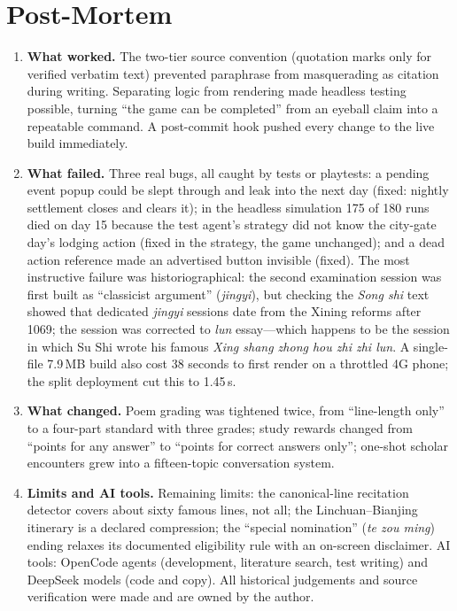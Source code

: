 \documentclass[12pt,a4paper]{article}
\begin{document}
\section{Post-Mortem}

\begin{enumerate}
  \item \textbf{What worked.} The two-tier source convention (quotation marks
  only for verified verbatim text) prevented paraphrase from masquerading as
  citation during writing. Separating logic from rendering made headless
  testing possible, turning ``the game can be completed'' from an eyeball
  claim into a repeatable command. A post-commit hook pushed every change to
  the live build immediately.
  \item \textbf{What failed.} Three real bugs, all caught by tests or
  playtests: a pending event popup could be slept through and leak into the
  next day (fixed: nightly settlement closes and clears it); in the headless
  simulation 175 of 180 runs died on day 15 because the test agent's strategy
  did not know the city-gate day's lodging action (fixed in the strategy, the
  game unchanged); and a dead action reference made an advertised button
  invisible (fixed). The most instructive failure was historiographical: the
  second examination session was first built as ``classicist argument''
  (\emph{jingyi}), but checking the \emph{Song shi} text showed that
  dedicated \emph{jingyi} sessions date from the Xining reforms after 1069;
  the session was corrected to \emph{lun} essay---which happens to be the
  session in which Su Shi wrote his famous \emph{Xing shang zhong hou zhi zhi
  lun}. A single-file 7.9\,MB build also cost 38 seconds to first render on
  a throttled 4G phone; the split deployment cut this to 1.45\,s.
  \item \textbf{What changed.} Poem grading was tightened twice, from
  ``line-length only'' to a four-part standard with three grades; study
  rewards changed from ``points for any answer'' to ``points for correct
  answers only''; one-shot scholar encounters grew into a fifteen-topic
  conversation system.
  \item \textbf{Limits and AI tools.} Remaining limits: the canonical-line
  recitation detector covers about sixty famous lines, not all; the
  Linchuan--Bianjing itinerary is a declared compression; the ``special
  nomination'' (\emph{te zou ming}) ending relaxes its documented
  eligibility rule with an on-screen disclaimer. AI tools: OpenCode agents
  (development, literature search, test writing) and DeepSeek models (code
  and copy). All historical judgements and source verification were made and
  are owned by the author.
\end{enumerate}

\singlespacing
\printbibliography[title={Bibliography}]
\end{document}
